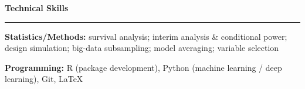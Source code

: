 \documentclass[a4paper,10pt]{article}
\newcommand{\resheading}[1]{
  \vspace{4pt}
  \noindent\textbf{\large #1}\par
  \vspace{2pt}
  \hrule
  \vspace{4pt}
}
\newenvironment{reslist}[1][0pt]{%
  \begin{list}{}{%
    \setlength{\leftmargin}{0pt}%
    \setlength{\rightmargin}{0pt}%
    \setlength{\labelwidth}{0pt}%
    \setlength{\labelsep}{0pt}%
    \setlength{\itemindent}{0pt}%
    \setlength{\listparindent}{0pt}%
    \setlength{\itemsep}{#1}%
    \setlength{\topsep}{0pt}%
    \setlength{\parsep}{0pt}%
    \setlength{\partopsep}{0pt}%
  }%
}{\end{list}}
\begin{document}
\resheading{Technical Skills}
\begin{reslist}[2pt]
  \item \textbf{Statistics/Methods:} survival analysis; interim analysis \& conditional power; design simulation; big-data subsampling; model averaging; variable selection
  \item \textbf{Programming:} R (package development), Python (machine learning / deep learning), Git, LaTeX
\end{reslist}
\end{document}
